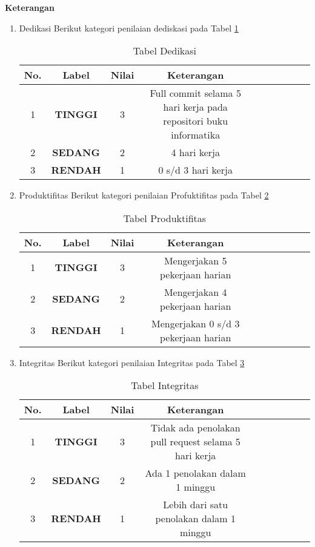\textbf{Keterangan}
\begin{enumerate}
\item Dedikasi
Berikut kategori penilaian dediskasi pada Tabel \ref{table:Dedikasi}
\begin{table}[!htbp]
\centering
\begin{tabular}{ |c|c|c|c|c|c|c|c|c|c| }
\hline
No. & Label & Nilai & Keterangan \\
\hline
1 & \textbf{TINGGI} & 3 & Full commit selama 5 hari kerja pada repositori buku informatika \\
\hline
2 & \textbf{SEDANG} & 2 & 4 hari kerja \\
\hline
3 & \textbf{RENDAH} & 1 & 0 s/d 3 hari kerja \\
\hline
\end{tabular}
\caption{Tabel Dedikasi}
\label{table:Dedikasi}
\end{table}

\item Produktifitas
Berikut kategori penilaian Profuktifitas pada Tabel \ref{table:Produktifitas}
\begin{table}[!htbp]
\centering
\begin{tabular}{ |c|c|c|c|c|c|c|c|c|c| }
\hline
No. & Label & Nilai & Keterangan \\
\hline
1 & \textbf{TINGGI} & 3 & Mengerjakan 5 pekerjaan harian \\
\hline
2 & \textbf{SEDANG} & 2 & Mengerjakan 4 pekerjaan harian \\
\hline
3 & \textbf{RENDAH} & 1 & Mengerjakan 0 s/d 3 pekerjaan harian \\
\hline
\end{tabular}
\caption{Tabel Produktifitas}
\label{table:Produktifitas}
\end{table}  

\item Integritas
Berikut kategori penilaian Integritas pada Tabel \ref{table:Integritas}
\begin{table}[!htbp]
\centering
\begin{tabular}{ |c|c|c|c|c|c|c|c|c|c| }
\hline
No. & Label & Nilai & Keterangan \\
\hline
1 & \textbf{TINGGI} & 3 & Tidak ada penolakan pull request selama 5 hari kerja \\
\hline
2 & \textbf{SEDANG} & 2 & Ada 1 penolakan dalam 1 minggu \\
\hline
3 & \textbf{RENDAH} & 1 & Lebih dari satu penolakan dalam 1 minggu \\
\hline
\end{tabular}
\caption{Tabel Integritas}
\label{table:Integritas}
\end{table}  


\end{enumerate}
